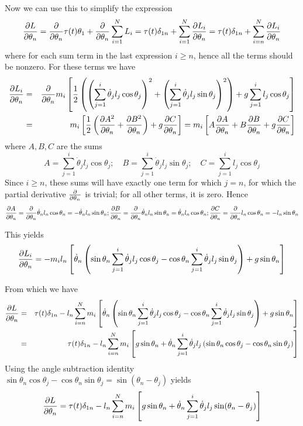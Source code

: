 \documentclass[12pt]{article}
\begin{document}
	Now we can use this to simplify the expression
	$$\pdv{L}{\theta_n}=\pdv{}{\theta_n}\tau(t)\theta_1+\pdv{\theta_n}\sum_{i=1}^N L_i=\tau(t)\delta_{1n}+\sum_{i=1}^N \pdv{L_i}{\theta_n}=\tau(t)\delta_{1n}+\sum_{i=n}^N \pdv{L_i}{\theta_n}$$
	where for each sum term in the last expression $i\geq n$, hence all the terms should be nonzero. For these terms we have
	\begin{eqnarray*}
	\pdv{L_i}{\theta_n}&=&\pdv{\theta_n}m_i\left[\frac{1}{2}\left(\left(\sum_{j=1}^i \dot{\theta}_j l_j \cos{\theta_j}\right)^2+\left(\sum_{j=1}^i \dot{\theta}_j l_j \sin{\theta_j}\right)^2\right)+g\sum_{j=1}^i l_j \cos{\theta_j}\right]\\
	&=&m_i\left[\frac{1}{2}\left(\pdv{A^2}{\theta_n}+\pdv{B^2}{\theta_n}\right)+g\pdv{C}{\theta_n}\right]=m_i\left[A\pdv{A}{\theta_n}+B\pdv{B}{\theta_n}+g\pdv{C}{\theta_n}\right]
	\end{eqnarray*}
	where $A,B,C$ are the sums
	$$A=\sum_{j=1}^i \dot{\theta}_j l_j \cos{\theta_j};\quad B=\sum_{j=1}^i \dot{\theta}_j l_j \sin{\theta_j};\quad C=\sum_{j=1}^i l_j \cos{\theta_j}$$
	Since $i\geq n$, these sums will have exactly one term for which $j=n$, for which the partial derivative $\pdv{\theta_n}$ is trivial; for all other terms, it is zero. Hence
	$$\pdv{A}{\theta_n}=\pdv{\theta_n}\dot{\theta}_n l_n \cos{\theta_n}=-\dot{\theta}_n l_n \sin{\theta_n}; \pdv{B}{\theta_n}=\pdv{\theta_n} \dot{\theta}_n l_n \sin{\theta_n}=\dot{\theta}_n l_n \cos{\theta_n}; \pdv{C}{\theta_n}=\pdv{\theta_n} l_n \cos{\theta_n}=-l_n \sin{\theta_n}$$
	
	This yields
	$$\pdv{L_i}{\theta_n}=-m_il_n\left[\dot{\theta}_n  \left(\sin{\theta_n}\sum_{j=1}^i \dot{\theta}_j l_j \cos{\theta_j}-\cos{\theta_n}\sum_{j=1}^i \dot{\theta}_j l_j \sin{\theta_j}\right)+g \sin{\theta_n}\right]$$
	
	From which we have
	\begin{eqnarray*}
	\pdv{L}{\theta_n}&=&\tau(t)\delta_{1n}-l_n\sum_{i=n}^N m_i\left[\dot{\theta}_n  \left(\sin{\theta_n}\sum_{j=1}^i \dot{\theta}_j l_j \cos{\theta_j}-\cos{\theta_n}\sum_{j=1}^i \dot{\theta}_j l_j \sin{\theta_j}\right)+g \sin{\theta_n}\right]\\
	&=&\tau(t)\delta_{1n}-l_n\sum_{i=n}^N m_i\left[g \sin{\theta_n} + \dot{\theta}_n \sum_{j=1}^i \dot{\theta}_j l_j \left(\sin{\theta_n}\cos{\theta_j}- \cos{\theta_n}\sin{\theta_j}\right)\right]
	\end{eqnarray*}
	Using the angle subtraction identity $\sin{\theta_n}\cos{\theta_j}-\cos{\theta_n}\sin{\theta_j}=\sin(\theta_n - \theta_j)$ yields
	$$\pdv{L}{\theta_n}=\tau(t)\delta_{1n}-l_n\sum_{i=n}^N m_i\left[g \sin{\theta_n} + \dot{\theta}_n \sum_{j=1}^i \dot{\theta}_j l_j \sin(\theta_n - \theta_j)\right]$$
\end{document}
